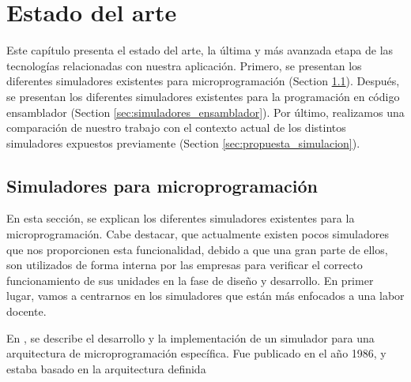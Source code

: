 \chead[]{}
\renewcommand{\headrulewidth}{0.5pt}

\lfoot[]{}
\cfoot[]{}
\rfoot[]{}
\renewcommand{\footrulewidth}{0pt}

\chapter{Estado del arte}
\label{ch:state_of_the_art}

Este capítulo presenta el estado del arte, la última y más avanzada etapa de las tecnologías relacionadas con nuestra aplicación. Primero, se presentan los diferentes simuladores existentes para microprogramación (Section \ref{sec:simuladores_microprogramacion}). Después, se presentan los diferentes simuladores existentes para la programación en código ensamblador (Section \ref{sec:simuladores_ensamblador}). Por último, realizamos una comparación de nuestro trabajo con el contexto actual de los distintos simuladores expuestos previamente (Section \ref{sec:propuesta_simulacion}).

\section{Simuladores para microprogramación}
\label{sec:simuladores_microprogramacion}

En esta sección, se explican los diferentes simuladores existentes para la microprogramación. Cabe destacar, que actualmente existen pocos simuladores que nos proporcionen esta funcionalidad, debido a que una gran parte de ellos, son utilizados de forma interna por las empresas para verificar el correcto funcionamiento de sus unidades en la fase de diseño y desarrollo. En primer lugar, vamos a centrarnos en los simuladores que están más enfocados a una labor docente.

En \cite{yen1986development}, se describe el desarrollo y la implementación de un simulador para una arquitectura de microprogramación específica. Fue publicado en el año 1986, y estaba basado en la arquitectura definida  



